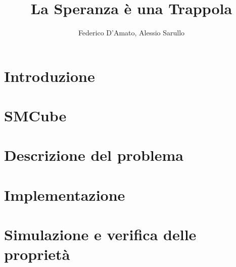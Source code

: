 \documentclass{article}
\title{La Speranza è una Trappola}
\author{Federico D'Amato, Alessio Sarullo}
\begin{document}
\maketitle


\section{Introduzione}

\section{SMCube}

\section{Descrizione del problema}
\label{Sec:problem}

\section{Implementazione}

\section{Simulazione e verifica delle proprietà}




\newpage
\nocite{*}		 %
{}

\end{document}
